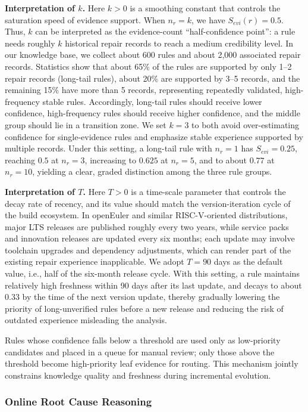 \documentclass[sigconf]{acmart}
\begin{document}
\textbf{Interpretation of $k$.} Here $k>0$ is a smoothing constant that controls the saturation speed of evidence support. When $n_r = k$, we have $S_{evi}(r)=0.5$. Thus, $k$ can be interpreted as the evidence-count ``half-confidence point'': a rule needs roughly $k$ historical repair records to reach a medium credibility level. In our knowledge base, we collect about 600 rules and about 2{,}000 associated repair records. Statistics show that about 65\% of the rules are supported by only 1--2 repair records (long-tail rules), about 20\% are supported by 3--5 records, and the remaining 15\% have more than 5 records, representing repeatedly validated, high-frequency stable rules. Accordingly, long-tail rules should receive lower confidence, high-frequency rules should receive higher confidence, and the middle group should lie in a transition zone. We set $k=3$ to both avoid over-estimating confidence for single-evidence rules and emphasize stable experience supported by multiple records. Under this setting, a long-tail rule with $n_r=1$ has $S_{evi}=0.25$, reaching $0.5$ at $n_r=3$, increasing to $0.625$ at $n_r=5$, and to about $0.77$ at $n_r=10$, yielding a clear, graded distinction among the three rule groups.

\textbf{Interpretation of $T$.} Here $T>0$ is a time-scale parameter that controls the decay rate of recency, and its value should match the version-iteration cycle of the build ecosystem. In openEuler and similar RISC-V-oriented distributions, major LTS releases are published roughly every two years, while service packs and innovation releases are updated every six months; each update may involve toolchain upgrades and dependency adjustments, which can render part of the existing repair experience inapplicable. We adopt $T=90$ days as the default value, i.e., half of the six-month release cycle. With this setting, a rule maintains relatively high freshness within 90 days after its last update, and decays to about 0.33 by the time of the next version update, thereby gradually lowering the priority of long-unverified rules before a new release and reducing the risk of outdated experience misleading the analysis.

Rules whose confidence falls below a threshold are used only as low-priority candidates and placed in a queue for manual review; only those above the threshold become high-priority leaf evidence for routing. This mechanism jointly constrains knowledge quality and freshness during incremental evolution.

\subsubsection{Online Root Cause Reasoning}
\end{document}
